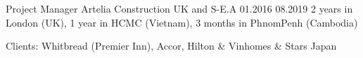 \begin{cventries}
  \cventry
    {Project Manager} %
    {Artelia} %
    {Construction}%
    {UK and S-E.A} %
    {01.2016} %
    {08.2019} %
    {2 years in London (UK), 1 year in HCMC (Vietnam), 3 months in PhnomPenh (Cambodia) } %
    {} %
    {
      \begin{cvitems} %
        \item {Clients: Whitbread (Premier Inn), Accor, Hilton \& Vinhomes \& Stars Japan} 
      \end{cvitems}
    }

\end{cventries}

